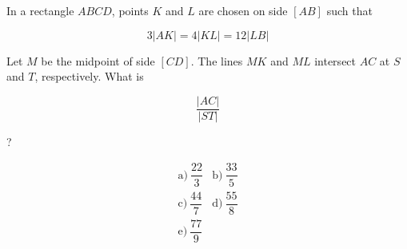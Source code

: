 In a rectangle \(ABCD\), points \(K\) and \(L\) are chosen on side \([AB]\) such that



\[
3|AK|=4|KL|=12|LB|
\]

Let \(M\) be the midpoint of side \([CD]\). The lines \(MK\) and \(ML\) intersect \(AC\) at \(S\) and \(T\), respectively. What is



\[
\dfrac{|AC|}{|ST|}
\]

?



\[
\begin{array}{ll}
\text{a)}\ \dfrac{22}{3} & \text{b)}\ \dfrac{33}{5} \\
\text{c)}\ \dfrac{44}{7} & \text{d)}\ \dfrac{55}{8} \\
\text{e)}\ \dfrac{77}{9}
\end{array}
\]
